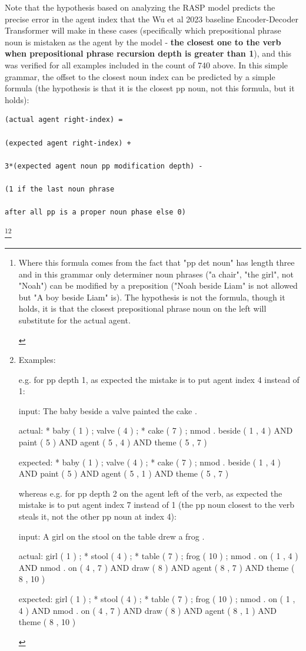 \documentclass[11pt]{article}
\begin{document}
Note that the hypothesis based on analyzing the RASP model predicts the precise error in the agent index that the Wu et al 2023 baseline Encoder-Decoder Transformer will make in these cases (specifically which prepositional phrase noun is mistaken as the agent by the model - \textbf{the closest one to the verb when prepositional phrase recursion depth is greater than 1}), and this was verified for all examples included in the count of 740 above.
In this simple grammar, the offset to the closest noun index can be predicted by a simple formula (the hypothesis is that it is the closest pp noun, not this formula, but it holds):
\begin{tiny}
\begin{verbatim}
(actual agent right-index) = 

(expected agent right-index) + 

3*(expected agent noun pp modification depth) - 

(1 if the last noun phrase 

after all pp is a proper noun phase else 0)
\end{verbatim}
\end{tiny}
\footnote{
\begin{tiny}
Where this formula comes from the fact that "pp det noun" has length three and in this grammar only determiner noun phrases ("a chair", "the girl", not "Noah") can be modified by a preposition ("Noah beside Liam" is not allowed but "A boy beside Liam" is). The hypothesis is not the formula, though it holds, it is that the closest prepositional phrase noun on the left will substitute for the actual agent.
\end{tiny}
}\footnote{
\begin{tiny}
Examples:

e.g. for pp depth 1, as expected the mistake is to put agent index 4 instead of 1:

input: The baby beside a valve painted the cake .

actual:   * baby ( 1 ) ; valve ( 4 ) ; * cake ( 7 ) ; nmod . beside ( 1 , 4 ) AND paint ( 5 ) AND agent ( 5 , 4 ) AND theme ( 5 , 7 )

expected: * baby ( 1 ) ; valve ( 4 ) ; * cake ( 7 ) ; nmod . beside ( 1 , 4 ) AND paint ( 5 ) AND agent ( 5 , 1 ) AND theme ( 5 , 7 )


whereas e.g. for pp depth 2 on the agent left of the verb, as expected the mistake is to put agent index 7 instead of 1 (the pp noun closest to the verb steals it, not the other pp noun at index 4):

input: A girl on the stool on the table drew a frog .

actual:   girl ( 1 ) ; * stool ( 4 ) ; * table ( 7 ) ; frog ( 10 ) ; nmod . on ( 1 , 4 ) AND nmod . on ( 4 , 7 ) AND draw ( 8 ) AND agent ( 8 , 7 ) AND theme ( 8 , 10 )

expected: girl ( 1 ) ; * stool ( 4 ) ; * table ( 7 ) ; frog ( 10 ) ; nmod . on ( 1 , 4 ) AND nmod . on ( 4 , 7 ) AND draw ( 8 ) AND agent ( 8 , 1 ) AND theme ( 8 , 10 )

\end{tiny}
}
\end{document}
